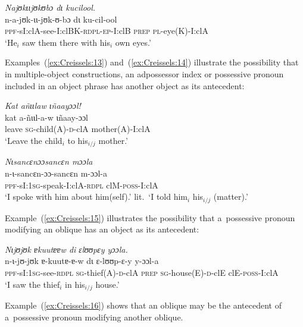 \documentclass[output=paper]{langscibook}
\begin{document}
\ea
  \label{ex:Creissels:12}
  
    \textit{Najʊkɩɩjʊkʊbɔ dɩ kucilool.}\\
    \gll n-a-jʊk-ɩɩ-jʊk-ʊ-bɔ dɩ ku-cil-ool\\
    \textsc{ppf}-sI:clA-see-I:clBK-\textsc{rdpl-ep}-I:clB \textsc{prep} \textsc{pl}-eye(K)-I:clA \\
    \glt `He$_i$ saw them there with his$_i$ own eyes.'
  
\z

Examples~(\ref{ex:Creissels:13}) and~(\ref{ex:Creissels:14}) illustrate the possibility
that in multiple-object constructions, an adpossessor index or possessive
pronoun included in an object phrase has another object as its antecedent:

\ea\label{ex:Creissels:13}
    \textit{Kat añɩɩlaw ɩñaayɔɔl!}\\
    \gll kat a-ñɩɩl-a-w ɩñaay-ɔɔl\\
    leave \textsc{sg}-child(A)-\textsc{d}-clA mother(A)-I:clA\\
    \glt `Leave the child$_i$ to his$_{i/j}$ mother.'
\z

 \ea\label{ex:Creissels:14}
    \textit{Nɩsancɛnɔɔsancɛn mɔɔla}\\
    \gll n-ɩ-sancɛn-ɔɔ-sancɛn m-ɔɔl-a\\
    \textsc{ppf}-sI:\textsc{1sg}-speak-I:clA-\textsc{rdpl} clM-\textsc{poss}-I:clA\\
    \glt `I spoke with him about him(self).' lit.\ `I told him$_i$ his$_{i/j}$ (matter).'
\z


Example~(\ref{ex:Creissels:15}) illustrates the possibility that a~possessive pronoun
modifying an oblique has an object as its antecedent:

\ea
  \label{ex:Creissels:15}
  
    \textit{Nɩjʊjʊk ɐkuutɐɐw di ɛlʊʊpɛy yɔɔla.}\\
    \gll n-ɩ-jʊ-jʊk ɐ-kuutɐ-ɐ-w dɩ ɛ-lʊʊp-ɛ-y y-ɔɔl-a\\
    \textsc{ppf}-sI:\textsc{1sg}-see-\textsc{rdpl} \textsc{sg}-thief(A)-\textsc{d}-clA \textsc{prep} \textsc{sg}-house(E)-\textsc{d}-clE clE-\textsc{poss}-I:clA\\
    \glt `I saw the thief$_i$ in his$_{i/j}$ house.'

\z

Example~(\ref{ex:Creissels:16}) shows that an oblique may be the antecedent of
a~possessive pronoun modifying another oblique.

\ea
  \label{ex:Creissels:16}
  
\end{document}
